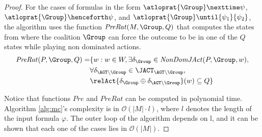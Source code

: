 \begin{proof}
For the cases of formulas in the form $\atloprat{\Group} \nexttime \psi$, $\atloprat{\Group} \henceforth \psi$,  and $\atloprat{\Group} \until{\psi_1}{\psi_2}$, the algorithm uses the function $\mathit{PreRat}(M, \Group, Q)$ that computes the states from where the coalition $\Group$ can force   the outcome to be in one of the $Q$ states while playing non dominated actions.
\begin{align*}
    \mathit{PreRat}(P, \Group, Q)  = & \{ w : w\in W, \exists \delta_\Group \in \mathit{NonDomJAct}(P,\Group,w), \\
& %
\forall \delta_{\AGT\setminus\Group}\in \JACT_{\AGT\setminus\Group}, \\ 
& \relAct{\delta_{\Group} \oplus    \delta_{\AGT\setminus\Group}}(w)\subseteq Q   \}
\end{align*} 

Notice that functions $Pre$ and $PreRat$ can
be computed in polynomial time. 
Algorithm \ref{alg:mc}'s complexity is in $\mathcal{O}(|M| \cdot l)$, where $l$ denotes the length of the input formula $\varphi$. The outer loop of the algorithm depends on l, and it can be shown that each one of the cases lies in $\mathcal{O}(|M|)$. 

\end{proof}
